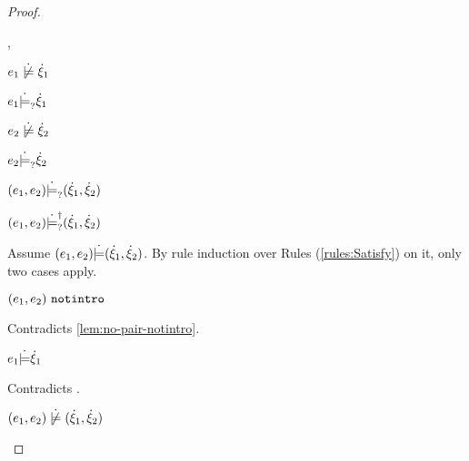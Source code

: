 \begin{proof}
\begin{byCases}
\begin{byCases}
\begin{byCases}
        \item[\cmaysatisfy{e_1}{\hxi_1},\cmaysatisfy{e_2}{\hxi_2}]
            \begin{pfsteps*}
            \item $\cnotsatisfy{e_1}{\hxi_1}$  
            \item $e_1 \dot{\models}_{?} \dot{\xi}_1$  
            \item $\cnotsatisfy{e_2}{\hxi_2}$  
            \item $e_2 \dot{\models}_{?} \dot{\xi}_2$  
            \item $(e_1 , e_2) \dot{\models}_{?} (\dot{\xi}_1 , \dot{\xi}_2)$  
            \item $(e_1 , e_2) \dot{\models}_{?}^{\dag} (\dot{\xi}_1 , \dot{\xi}_2)$ 
            \end{pfsteps*}
            Assume $(e_1 , e_2) \dot{\models} (\dot{\xi}_1 , \dot{\xi}_2)$. By rule induction over Rules (\ref{rules:Satisfy}) on it, only two cases apply. 
           \begin{byCases}
            \item[\text{(\ref{rule:CSNotIntroPair})}]
                \begin{pfsteps*}
                \item $(e_1 , e_2) ~\mathtt{notintro}$ 
                \end{pfsteps*}
                Contradicts \autoref{lem:no-pair-notintro}.
            \item[\text{(\ref{rule:CSPair})}]
                \begin{pfsteps*}
                \item $e_1 \dot{\models} \dot{\xi}_1$ 
                \end{pfsteps*}
                Contradicts .
            \end{byCases}
            \begin{pfsteps*}
            \item $\cnotsatisfy{\hpair{e_1}{e_2}}{\cpair{\hxi_1}{\hxi_2}}$  
            \end{pfsteps*}
            

\end{byCases}
\end{byCases}
\end{byCases}
\end{proof}
